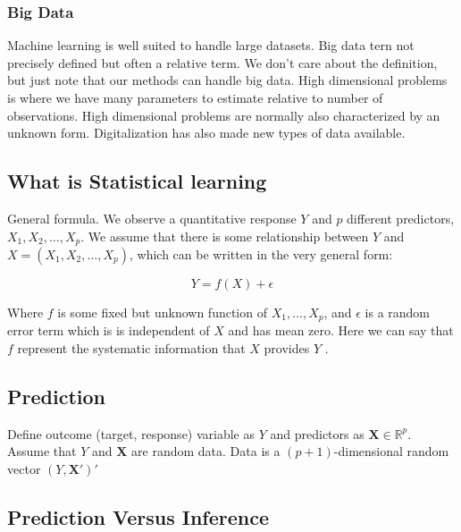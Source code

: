 \documentclass[11pt,a4paper]{article}
\begin{document}
\subsubsection{Big Data}

Machine learning is well suited to handle large datasets. Big data tern not precisely defined but often a relative term. We don't care about the definition, but just note that our methods can handle big data.
\newline
High dimensional problems is where we have many parameters to estimate relative to number of observations. High dimensional problems are normally also characterized by an unknown form. Digitalization has also made new types of data available.

\subsection{What is Statistical learning}

General formula. We observe a quantitative response \(Y\) and \(p\)
different predictors, \(X_{1}, X_{2}, \ldots, X_{p}\). We assume that there is some
relationship between \(Y\) and \(X=\left(X_{1}, X_{2}, \ldots, X_{p}\right)\), which can be written
in the very general form:

\begin{equation}
    Y=f(X)+\epsilon
\end{equation}

Where $f$ is some fixed but unknown function of $X_{1}, \ldots, X_{p}$, and $\epsilon$ is a random error term which is is independent of $X$ and has mean zero. Here we can say that $f$ represent the systematic information that $X$ provides $Y$ 
\cite{james2013introduction}.

\subsection{Prediction}

Define outcome (target, response) variable as $Y$ and predictors as $\mathbf{X}\in \mathbb{R}^p$.
Assume that $Y$ and $\mathbf{X}$ are random data.
Data is a $(p+1)$-dimensional random vector $(Y,\mathbf{X}')'$

\subsection{Prediction Versus Inference}
\end{document}
